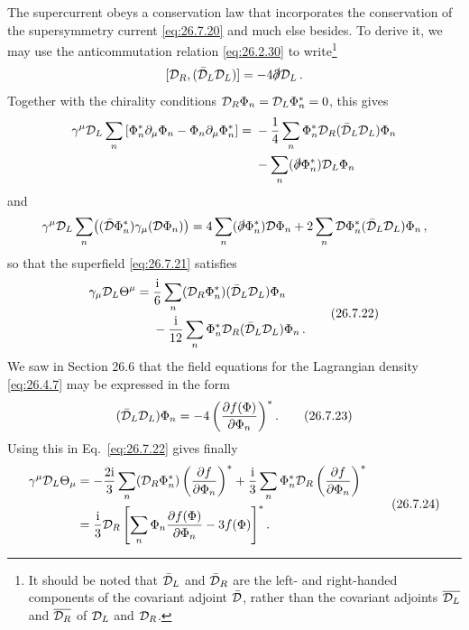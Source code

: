 The supercurrent obeys a conservation law that incorporates the conservation
of the supersymmetry current \eqref{eq:26.7.20} and much else besides. To
derive it, we may use the anticommutation relation \eqref{eq:26.2.30} to
write\footnote{It should be noted that \(\bar{\mathcal{D}}_L\) and
\(\bar{\mathcal{D}}_R\) are the left- and right-handed components of the
covariant adjoint \(\bar{\mathcal{D}}\), rather than the covariant adjoints
\(\overline{\mathcal{D}_L}\) and \(\overline{\mathcal{D}_R}\) of \(\mathcal{D}_L\) and
\(\mathcal{D}_R\).}
\[
  [\mathcal{D}_R,(\bar{\mathcal{D}}_L\mathcal{D}_L)]
  =-4\slashed{\partial}\mathcal{D}_L\,.
\]
Together with the chirality conditions
\(\mathcal{D}_R\Phi_n=\mathcal{D}_L\Phi_n^*=0\), this gives
\[
  \begin{aligned}
  \gamma^\mu\mathcal{D}_L\sum_n
  \left[\Phi_n^*\partial_\mu\Phi_n
       -\Phi_n\partial_\mu\Phi_n^*\right]
  ={}&-\frac14\sum_n
      \Phi_n^*\mathcal{D}_R(\bar{\mathcal{D}}_L\mathcal{D}_L)\Phi_n
  \\
     &-\sum_n(\slashed{\partial}\Phi_n^*)\mathcal{D}_L\Phi_n
  \end{aligned}
\]
and
\[
  \gamma^\mu\mathcal{D}_L\sum_n
  \bigl((\bar{\mathcal{D}}\Phi_n^*)\gamma_\mu(\mathcal{D}\Phi_n)\bigr)
  =4\sum_n(\slashed{\partial}\Phi_n^*)\mathcal{D}\Phi_n
   +2\sum_n\mathcal{D}\Phi_n^*
      (\bar{\mathcal{D}}_L\mathcal{D}_L)\Phi_n\,,
\]
so that the superfield \eqref{eq:26.7.21} satisfies
\begin{equation}
  \begin{aligned}
  \gamma_\mu\mathcal{D}_L\Theta^\mu
  ={}&\frac{\mathrm{i}}{6}\sum_n
      (\mathcal{D}_R\Phi_n^*)(\bar{\mathcal{D}}_L\mathcal{D}_L)\Phi_n
  \\
     &-\frac{\mathrm{i}}{12}\sum_n
      \Phi_n^*\mathcal{D}_R(\bar{\mathcal{D}}_L\mathcal{D}_L)\Phi_n\,.
  \end{aligned}
  \tag{26.7.22}\label{eq:26.7.22}
\end{equation}
We saw in Section 26.6 that the field equations for the Lagrangian density
\eqref{eq:26.4.7} may be expressed in the form
\begin{equation}
  (\bar{\mathcal{D}}_L\mathcal{D}_L)\Phi_n
  =-4\left(\frac{\partial f(\Phi)}{\partial\Phi_n}\right)^* .
  \tag{26.7.23}\label{eq:26.7.23}
\end{equation}
Using this in Eq.~\eqref{eq:26.7.22} gives finally
\begin{equation}
  \begin{aligned}
  \gamma^\mu\mathcal{D}_L\Theta_\mu
  &=-\frac{2\mathrm{i}}{3}\sum_n
    (\mathcal{D}_R\Phi_n^*)
    \left(\frac{\partial f}{\partial\Phi_n}\right)^*
   +\frac{\mathrm{i}}{3}\sum_n
    \Phi_n^*\mathcal{D}_R
    \left(\frac{\partial f}{\partial\Phi_n}\right)^*
  \\
  &=\frac{\mathrm{i}}{3}\mathcal{D}_R
    \left[
      \sum_n\Phi_n\frac{\partial f(\Phi)}{\partial\Phi_n}
      -3f(\Phi)
    \right]^* .
  \end{aligned}
  \tag{26.7.24}\label{eq:26.7.24}
\end{equation}
